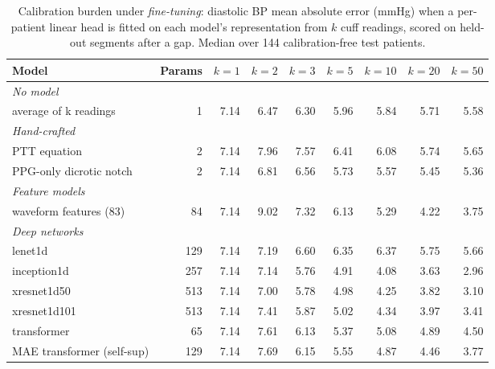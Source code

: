 \begin{table}[t]
\centering
\small
\caption{Calibration burden under \emph{fine-tuning}: diastolic BP mean absolute error (mmHg) when a per-patient linear head is fitted on each model's representation from $k$ cuff readings, scored on held-out segments after a gap. Median over 144 calibration-free test patients.}
\label{tab:calib-finetune}
\begin{tabular}{l r rrrrrrr}
\toprule
Model & Params & $k{=}1$ & $k{=}2$ & $k{=}3$ & $k{=}5$ & $k{=}10$ & $k{=}20$ & $k{=}50$ \\
\midrule
\multicolumn{9}{l}{\textit{No model}} \\
\quad average of k readings & 1 & 7.14 & 6.47 & 6.30 & 5.96 & 5.84 & 5.71 & 5.58 \\
\multicolumn{9}{l}{\textit{Hand-crafted}} \\
\quad PTT equation & 2 & 7.14 & 7.96 & 7.57 & 6.41 & 6.08 & 5.74 & 5.65 \\
\quad PPG-only dicrotic notch & 2 & 7.14 & 6.81 & 6.56 & 5.73 & 5.57 & 5.45 & 5.36 \\
\multicolumn{9}{l}{\textit{Feature models}} \\
\quad waveform features (83) & 84 & 7.14 & 9.02 & 7.32 & 6.13 & 5.29 & 4.22 & 3.75 \\
\multicolumn{9}{l}{\textit{Deep networks}} \\
\quad lenet1d & 129 & 7.14 & 7.19 & 6.60 & 6.35 & 6.37 & 5.75 & 5.66 \\
\quad inception1d & 257 & 7.14 & 7.14 & 5.76 & 4.91 & 4.08 & 3.63 & 2.96 \\
\quad xresnet1d50 & 513 & 7.14 & 7.00 & 5.78 & 4.98 & 4.25 & 3.82 & 3.10 \\
\quad xresnet1d101 & 513 & 7.14 & 7.41 & 5.87 & 5.02 & 4.34 & 3.97 & 3.41 \\
\quad transformer & 65 & 7.14 & 7.61 & 6.13 & 5.37 & 5.08 & 4.89 & 4.50 \\
\quad MAE transformer (self-sup) & 129 & 7.14 & 7.69 & 6.15 & 5.55 & 4.87 & 4.46 & 3.77 \\
\bottomrule
\end{tabular}
\end{table}